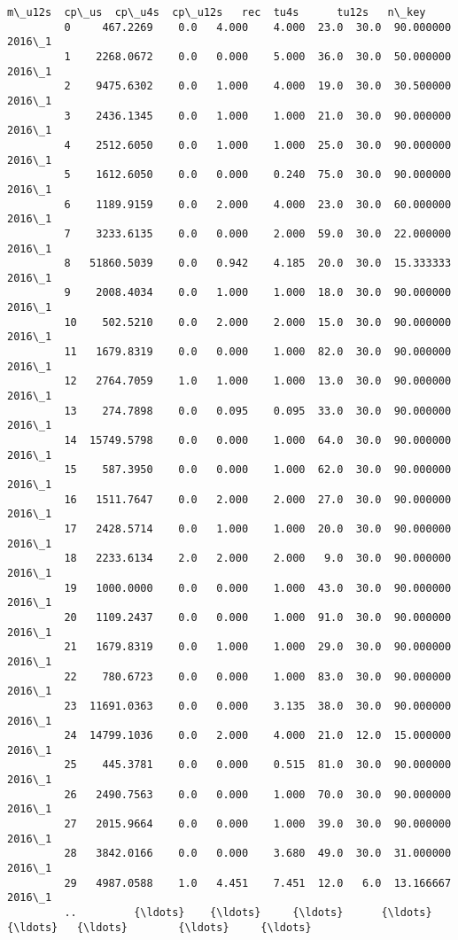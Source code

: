 \documentclass[11pt]{article}
\begin{document}
\begin{Verbatim}[commandchars=\\\{\}]
                 m\_u12s  cp\_us  cp\_u4s  cp\_u12s   rec  tu4s      tu12s   n\_key  
         0     467.2269    0.0   4.000    4.000  23.0  30.0  90.000000  2016\_1  
         1    2268.0672    0.0   0.000    5.000  36.0  30.0  50.000000  2016\_1  
         2    9475.6302    0.0   1.000    4.000  19.0  30.0  30.500000  2016\_1  
         3    2436.1345    0.0   1.000    1.000  21.0  30.0  90.000000  2016\_1  
         4    2512.6050    0.0   1.000    1.000  25.0  30.0  90.000000  2016\_1  
         5    1612.6050    0.0   0.000    0.240  75.0  30.0  90.000000  2016\_1  
         6    1189.9159    0.0   2.000    4.000  23.0  30.0  60.000000  2016\_1  
         7    3233.6135    0.0   0.000    2.000  59.0  30.0  22.000000  2016\_1  
         8   51860.5039    0.0   0.942    4.185  20.0  30.0  15.333333  2016\_1  
         9    2008.4034    0.0   1.000    1.000  18.0  30.0  90.000000  2016\_1  
         10    502.5210    0.0   2.000    2.000  15.0  30.0  90.000000  2016\_1  
         11   1679.8319    0.0   0.000    1.000  82.0  30.0  90.000000  2016\_1  
         12   2764.7059    1.0   1.000    1.000  13.0  30.0  90.000000  2016\_1  
         13    274.7898    0.0   0.095    0.095  33.0  30.0  90.000000  2016\_1  
         14  15749.5798    0.0   0.000    1.000  64.0  30.0  90.000000  2016\_1  
         15    587.3950    0.0   0.000    1.000  62.0  30.0  90.000000  2016\_1  
         16   1511.7647    0.0   2.000    2.000  27.0  30.0  90.000000  2016\_1  
         17   2428.5714    0.0   1.000    1.000  20.0  30.0  90.000000  2016\_1  
         18   2233.6134    2.0   2.000    2.000   9.0  30.0  90.000000  2016\_1  
         19   1000.0000    0.0   0.000    1.000  43.0  30.0  90.000000  2016\_1  
         20   1109.2437    0.0   0.000    1.000  91.0  30.0  90.000000  2016\_1  
         21   1679.8319    0.0   1.000    1.000  29.0  30.0  90.000000  2016\_1  
         22    780.6723    0.0   0.000    1.000  83.0  30.0  90.000000  2016\_1  
         23  11691.0363    0.0   0.000    3.135  38.0  30.0  90.000000  2016\_1  
         24  14799.1036    0.0   2.000    4.000  21.0  12.0  15.000000  2016\_1  
         25    445.3781    0.0   0.000    0.515  81.0  30.0  90.000000  2016\_1  
         26   2490.7563    0.0   0.000    1.000  70.0  30.0  90.000000  2016\_1  
         27   2015.9664    0.0   0.000    1.000  39.0  30.0  90.000000  2016\_1  
         28   3842.0166    0.0   0.000    3.680  49.0  30.0  31.000000  2016\_1  
         29   4987.0588    1.0   4.451    7.451  12.0   6.0  13.166667  2016\_1  
         ..         {\ldots}    {\ldots}     {\ldots}      {\ldots}   {\ldots}   {\ldots}        {\ldots}     {\ldots}  

\end{Verbatim}
\end{document}

